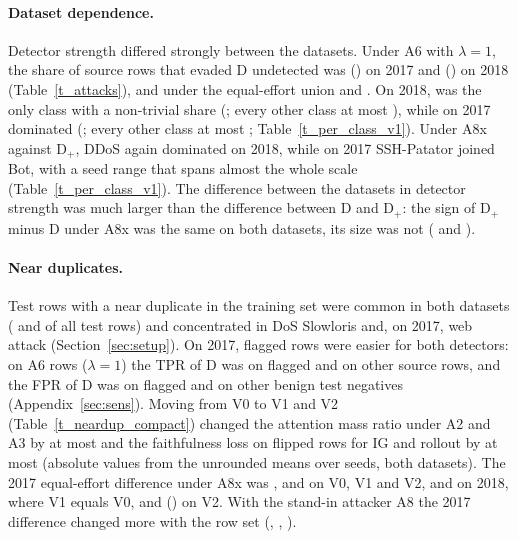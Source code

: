 \paragraph{Dataset dependence.}
Detector strength differed strongly between the datasets.
Under A6 with $\lambda = 1$, the share of source rows that evaded D undetected was \undetDAsixOneVoneSeventeen{}
(\undetDAsixOneVoneSeventeenRange) on 2017 and \undetDAsixOneVoneEighteen{} (\undetDAsixOneVoneEighteenRange) on 2018
(Table~\ref{t_attacks}), and under the equal-effort union \axHeadVoneSeventeenD{} and \axHeadVoneEighteenD.
On 2018, \pcTopClassEighteen{} was the only class with a non-trivial share (\pcTopEighteen; every other class at most
\pcRestMaxEighteen), while on 2017 \pcTopClassSeventeen{} dominated (\pcTopSeventeen; every other class at most
\pcRestMaxSeventeen; Table~\ref{t_per_class_v1}).
Under A8x against D$_+$, DDoS again dominated on 2018, while on 2017 SSH-Patator joined Bot, with a seed range that
spans almost the whole scale (Table~\ref{t_per_class_v1}).
The difference between the datasets in detector strength was much larger than the difference between D and D$_+$:
the sign of D$_+$ minus D under A8x was the same on both datasets, its size was not (\axHeadVoneSeventeen{} and
\axHeadVoneEighteen).



\paragraph{Near duplicates.}
Test rows with a near duplicate in the training set were common in both datasets (\ndAllSeventeen{} and
\ndAllEighteen{} of all test rows) and concentrated in DoS Slowloris and, on 2017, web attack (Section~\ref{sec:setup}).
On 2017, flagged rows were easier for both detectors: on A6 rows ($\lambda = 1$) the TPR of D was \tprDNdSeventeen{} on
flagged and \tprDOtherSeventeen{} on other source rows, and the FPR of D was \fprDNdSeventeen{} on flagged and
\fprDOtherSeventeen{} on other benign test negatives (Appendix~\ref{sec:sens}).
Moving from V0 to V1 and V2 (Table~\ref{t_neardup_compact}) changed the attention mass ratio under A2 and A3 by at
most \sensMaxMassChange{} and the faithfulness loss on flipped rows for IG and rollout by at most \sensMaxFlipChange{}
(absolute values from the unrounded means over seeds, both datasets).
The 2017 equal-effort difference under A8x was \axHeadVzeroSeventeen{}, \axHeadVoneSeventeen{} and
\axHeadVtwoSeventeen{} on V0, V1 and V2, and on 2018, where V1 equals V0, \axHeadVoneEighteen{} and
\axHeadVtwoEighteen{} (\axHeadVtwoEighteenCI) on V2.
With the stand-in attacker A8 the 2017 difference changed more with the row set (\axStandinVzeroSeventeen,
\axStandinVoneSeventeen, \axStandinVtwoSeventeen).


